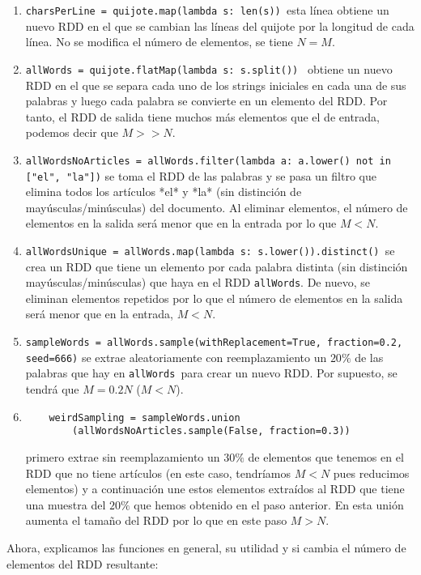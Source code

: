 \documentclass[11pt]{article}
\def\inline{\lstinline[basicstyle=\ttfamily,keywordstyle={}]}
\begin{document}
\begin{enumerate}
\item  \inline{charsPerLine = quijote.map(lambda s: len(s)) }esta línea obtiene un nuevo RDD en el que se cambian las líneas del quijote por la longitud de cada línea. No se modifica el número de elementos, se tiene $N = M$.

\item  \inline{allWords = quijote.flatMap(lambda s: s.split()) } obtiene un nuevo RDD en el que se separa cada uno de los strings iniciales en cada una de sus palabras y luego cada palabra se convierte en un elemento del RDD. Por tanto, el RDD de salida tiene muchos más elementos que el de entrada, podemos decir que $M >> N$.

\item  \inline{allWordsNoArticles = allWords.filter(lambda a: a.lower() not in ["el", "la"])} se toma el RDD de las palabras y se pasa un filtro que elimina todos los artículos *el* y *la* (sin distinción de mayúsculas/minúsculas) del documento. Al eliminar elementos, el número de elementos en la salida será menor que en la entrada por lo que $M < N$.

\item  \inline{allWordsUnique = allWords.map(lambda s: s.lower()).distinct() }se crea un RDD que tiene un elemento por cada palabra distinta (sin distinción mayúsculas/minúsculas) que haya en el RDD  \inline{allWords}. De nuevo, se eliminan elementos repetidos por lo que el número de elementos en la salida será menor que en la entrada, $M < N$.

\item  \inline{sampleWords = allWords.sample(withReplacement=True, fraction=0.2, seed=666)} se extrae aleatoriamente con reemplazamiento un $20\%$ de las palabras que hay en \inline{allWords }para crear un nuevo RDD. Por supuesto, se tendrá que $M = 0.2 N$ ($M < N$).

\item  \begin{verbatim}
    weirdSampling = sampleWords.union
        (allWordsNoArticles.sample(False, fraction=0.3))
\end{verbatim} 
primero extrae sin reemplazamiento un $30\%$ de elementos que tenemos en el RDD que no tiene artículos (en este caso, tendríamos $M < N$ pues reducimos elementos) y a continuación une estos elementos extraídos al RDD que tiene una muestra del $20\%$ que hemos obtenido en el paso anterior. En esta unión aumenta el tamaño del RDD por lo que en este paso $M > N$.

\end{enumerate}
Ahora, explicamos las funciones en general, su utilidad y si cambia el número de elementos del RDD resultante:
\end{document}
